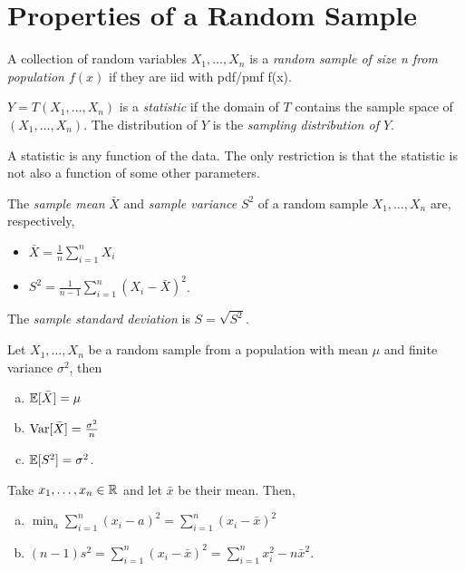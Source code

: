 \section{Properties of a Random Sample}

\begin{definition}
    A collection of random variables $X_1, \dots, X_n$ is a \emph{random sample of size n from population $f(x)$} if they are iid with pdf/pmf f(x).
\end{definition}

\begin{definition}[Statistic]
    $Y = T(X_1, \dots, X_n)$ is a \emph{statistic} if the domain of $T$ contains the sample space of $(X_1, \dots, X_n)$. The distribution of $Y$ is the \emph{sampling distribution of $Y$}.
\end{definition}

\begin{remark}
    A statistic is any function of the data. The only restriction is that the statistic is not also a function of some other parameters.
\end{remark}

\begin{definition}
    The \emph{sample mean} $\bar{X}$ and \emph{sample variance} $S^2$ of a random sample $X_1, \dots, X_n$ are, respectively,
    \begin{itemize}
        \item $\bar{X} = \frac1n \sum_{i=1}^n X_i$
        \item $S^2 = \frac{1}{n-1}\sum_{i=1}^n (X_i - \bar{X})^2$.
    \end{itemize}
    The \emph{sample standard deviation} is $S = \sqrt{S^2}$.
\end{definition}

\begin{theorem}
    Let $X_1, \dots, X_n$ be a random sample from a population with mean $\mu$ and finite variance $\sigma^2$, then
    \begin{enumerate}[a.]
        \item $\mathbb{E}{}[\bar{X}] = \mu$
        \item $\text{Var}{}[\bar{X}] = \frac{\sigma^2}{n}$
        \item $\mathbb{E}{}[S^2] = \sigma ^2$.
    \end{enumerate}
\end{theorem}

\begin{theorem}
    Take $x_1, \dots, x_n \in \mathbb{R}{}$ and let $\bar{x}$ be their mean. Then,
    \begin{enumerate}[a.]
        \item $\min_a \sum_{i=1}^n (x_i - a)^2 = \sum_{i=1}^n (x_i - \bar{x})^2$
        \item $(n-1)s^2 = \sum_{i=1}^n(x_i - \bar{x})^2 = \sum_{i=1}^n x_i^2 - n\bar{x}^2$.
    \end{enumerate}
\end{theorem}

